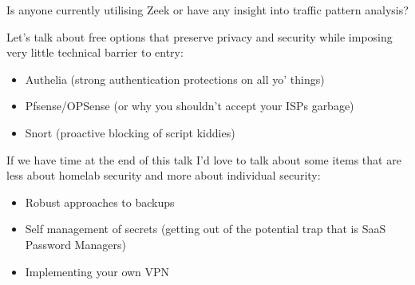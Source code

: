 \documentclass{beamer}
\begin{document}
\begin{frame}
    Is anyone currently utilising Zeek or have any insight into traffic pattern analysis?
\end{frame}

\begin{frame}
    Let's talk about free options that preserve privacy and security while imposing 
    very little technical barrier to entry:
    \begin{itemize}
        \item Authelia (strong authentication protections on all yo' things)
        \item Pfsense/OPSense (or why you shouldn't accept your ISPs garbage)
        \item Snort (proactive blocking of script kiddies)
    \end{itemize}
\end{frame}

\begin{frame}
    If we have time at the end of this talk I'd love to talk about some items that are
    less about homelab security and more about individual security:
    \begin{itemize}
        \item Robust approaches to backups
        \item Self management of secrets (getting out of the potential trap that is SaaS Password Managers)
        \item Implementing your own VPN
    \end{itemize}
\end{frame}
\end{document}
